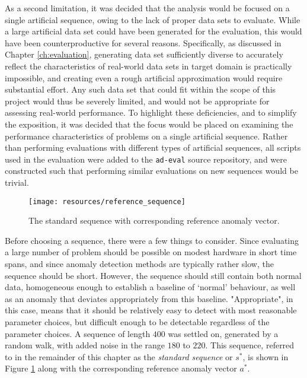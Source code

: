 As a second limitation, it was decided that the analysis would be focused on a single artificial sequence, owing to the lack of proper data sets to evaluate.
While a large artificial data set could have been generated for the evaluation, this would have been counterproductive for several reasons.
Specifically, as discussed in Chapter \ref{ch:evaluation}, generating data set sufficiently diverse to accurately reflect the characteristics of real-world data sets in target domain is practically impossible, and creating even a rough artificial approximation would require substantial effort.
Any such data set that could fit within the scope of this project would thus be severely limited, and would not be appropriate for assessing real-world performance.
To highlight these deficiencies, and to simplify the exposition, it was decided that the focus would be placed on examining the performance characteristics of problems on a single artificial sequence.
Rather than performing evaluations with different types of artificial sequences, all scripts used in the evaluation were added to the \texttt{ad-eval} source repository, and were constructed such that performing similar evaluations on new sequences would be trivial.

\begin{figure}[h]
    \vspace{-10pt}
    \begin{center}
        \texttt{[image: resources/reference\_sequence]}
    \end{center}
    \vspace{-20pt}
    \caption{\small{The standard sequence with corresponding reference anomaly vector.}}
    \label{fig:reference_sequence}
    \vspace{-10pt}
\end{figure}

Before choosing a sequence, there were a few things to consider. Since evaluating a large number of problem should be possible on modest hardware in short time spans, and since anomaly detection methods are typically rather slow, the sequence should be short. However, the sequence should still contain both normal data, homogeneous enough to establish a baseline of `normal' behaviour, as well as an anomaly that deviates appropriately from this baseline. "Appropriate", in this case, means that it should be relatively easy to detect with most reasonable parameter choices, but difficult enough to be detectable regardless of the parameter choices. A sequence of length $400$ was settled on, generated by a random walk, with added noise in the range $180$ to $220$. This sequence, referred to in the remainder of this chapter as the \emph{standard sequence} or $s^*$, is shown in Figure \ref{fig:reference_sequence} along with the corresponding reference anomaly vector $a^*$.

